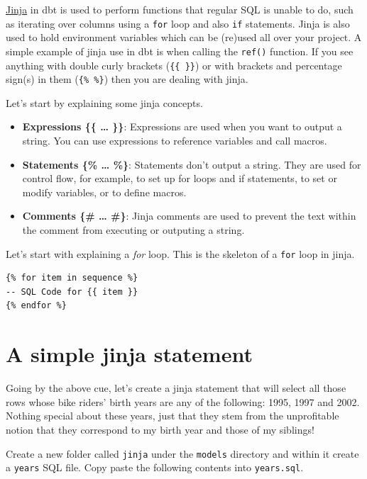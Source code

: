 \documentclass[
]{book}
\begin{document}
\href{https://docs.getdbt.com/docs/build/jinja-macros}{Jinja} in dbt is used to perform functions that regular SQL is unable to do, such as iterating over columns using a \texttt{for} loop and also \texttt{if} statements. Jinja is also used to hold environment variables which can be (re)used all over your project. A simple example of jinja use in dbt is when calling the \texttt{ref()} function. If you see anything with double curly brackets (\texttt{\{\{\ \}\}}) or with brackets and percentage sign(s) in them (\texttt{\{\%\ \%\}}) then you are dealing with jinja.

Let's start by explaining some jinja concepts.

\begin{itemize}
\item
  \textbf{Expressions \{\{ \ldots{} \}\}}: Expressions are used when you want to output a string. You can use expressions to reference variables and call macros.
\item
  \textbf{Statements \{\% \ldots{} \%\}}: Statements don't output a string. They are used for control flow, for example, to set up for loops and if statements, to set or modify variables, or to define macros.
\item
  \textbf{Comments \{\# \ldots{} \#\}}: Jinja comments are used to prevent the text within the comment from executing or outputing a string.
\end{itemize}

Let's start with explaining a \emph{for} loop. This is the skeleton of a \texttt{for} loop in jinja.

\begin{verbatim}
{% for item in sequence %}
-- SQL Code for {{ item }}
{% endfor %}
\end{verbatim}

\hypertarget{a-simple-jinja-statement}{%
\section{A simple jinja statement}\label{a-simple-jinja-statement}}

Going by the above cue, let's create a jinja statement that will select all those rows whose bike riders' birth years are any of the following: 1995, 1997 and 2002. Nothing special about these years, just that they stem from the unprofitable notion that they correspond to my birth year and those of my siblings!

Create a new folder called \texttt{jinja} under the \texttt{models} directory and within it create a \texttt{years} SQL file. Copy paste the following contents into \texttt{years.sql}.
\end{document}
